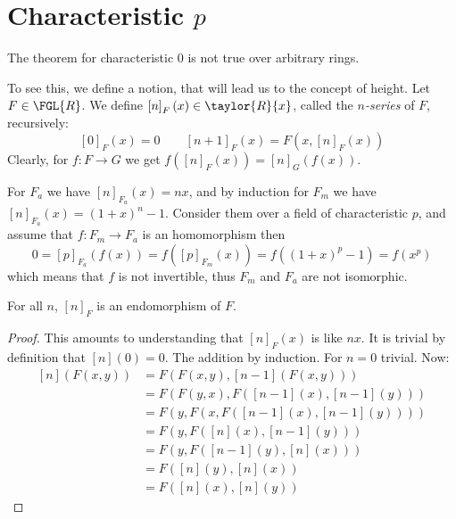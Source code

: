 \section{Characteristic $p$}

\begin{remark*}
	The theorem for characteristic 0 is not true over arbitrary rings.
	
	To see this, we define a notion, that will lead us to the concept of height.
	Let $F \in \FGL{R}$. We define $\left[n\right]_F \left(x\right) \in \taylor{R}{x}$, called the \emph{$n$-series} of $F$, recursively:
	$$
		\left[0\right]_F \left(x\right) = 0
		\qquad
		\left[n+1\right]_F \left(x\right) = F\left(x, \left[n\right]_F \left(x\right)\right)
	$$
	Clearly, for $f: F \to G$ we get
	$
		f\left(\left[n\right]_F \left(x\right)\right)
		=
		\left[n\right]_G \left(f\left(x\right)\right)
	$.
	
	For $F_a$ we have $\left[n\right]_{F_a} \left(x\right) = nx$,
	and by induction for $F_m$ we have $\left[n\right]_{F_a} \left(x\right) = \left(1+x\right)^n - 1$.
	Consider them over a field of characteristic $p$, and assume that $f: F_m \to F_a$ is an homomorphism then
	$$
		0
		=
		\left[p\right]_{F_a} \left(f\left(x\right)\right)
		=
		f\left(\left[p\right]_{F_m} \left(x\right)\right)
		=
		f\left(\left(1+x\right)^p-1\right)
		=
		f\left(x^p\right)
	$$
	which means that $f$ is not invertible, thus $F_m$ and $F_a$ are not isomorphic.
\end{remark*}

\begin{lemma*}
	For all $n$, $\left[n\right]_F$ is an endomorphism of $F$.
\end{lemma*}

\begin{proof}
	This amounts to understanding that $\left[n\right]_F\left(x\right)$ is like $nx$.
	It is trivial by definition that $\left[n\right]\left(0\right)=0$.
	The addition by induction. For $n=0$ trivial.
	Now:
	\begin{align*}
		\left[n\right]\left(F\left(x,y\right)\right)
		&= F\left(
			F\left(x,y\right),
			\left[n-1\right]\left(F\left(x,y\right)\right)
		\right)\\
		&= F\left(
			F\left(y,x\right),
			F\left(\left[n-1\right]\left(x\right),\left[n-1\right]\left(y\right)\right)
		\right)\\
		&= F\left(
			y,
			F\left(
				x,
				F\left(\left[n-1\right]\left(x\right),\left[n-1\right]\left(y\right)\right)
			\right)
		\right)\\
		&= F\left(
			y,
			F\left(
				\left[n\right]\left(x\right)
				,\left[n-1\right]\left(y\right)
			\right)
		\right)\\
		&= F\left(
			y,
			F\left(
				\left[n-1\right]\left(y\right),
				\left[n\right]\left(x\right)
			\right)
		\right)\\
		&= F\left(
			\left[n\right]\left(y\right),
			\left[n\right]\left(x\right)
		\right)\\
		&= F\left(
			\left[n\right]\left(x\right),
			\left[n\right]\left(y\right)
		\right)
	\end{align*}
\end{proof}

